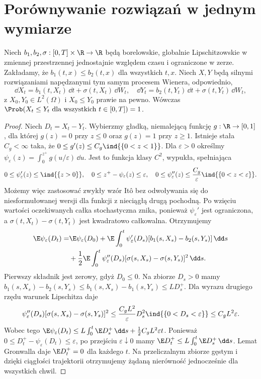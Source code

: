 \section{Porównywanie rozwiązań w jednym wymiarze}
\begin{twierdzenie}
\label{th:sde-comparison}
Niech $b_1,b_2,\sigma:[0,T]\times\R\to\R$
będą borelowskie, globalnie Lipschitzowskie w
zmiennej przestrzennej jednostajnie względem czasu
i ograniczone w zerze. Zakładamy, że
$b_1(t,x)\le b_2(t,x)$ dla wszystkich $t,x$.
Niech $X,Y$ będą silnymi rozwiązaniami napędzanymi
tym samym procesem Wienera, odpowiednio,
\[
\dd X_t=b_1(t,X_t)\,\dd t+\sigma(t,X_t)\,\dd W_t,
\quad
\dd Y_t=b_2(t,Y_t)\,\dd t+\sigma(t,Y_t)\,\dd W_t,
\]
z $X_0,Y_0\in L^2(\Omega)$ i $X_0\le Y_0$ prawie
na pewno. Wówczas
$\Prob(X_t\le Y_t\ \text{dla wszystkich }t\in[0,T])=1$.
\end{twierdzenie}
\begin{proof}
Niech $D_t=X_t-Y_t$. Wybierzmy gładką, niemalejącą
funkcję $g:\R\to[0,1]$, dla której $g(z)=0$
przy $z\le0$ oraz $g(z)=1$ przy $z\ge1$.
Istnieje stała $C_g<\infty$ taka, że
$0\le g'(z)\le C_g\ind{\{0<z<1\}}$.
Dla $\varepsilon>0$ określmy
$\psi_\varepsilon(z)=\int_0^{z^+}g(u/\varepsilon)\,\dd u$.
Jest to funkcja klasy $C^2$, wypukła, spełniająca
\[
0\le\psi_\varepsilon'(z)\le\ind{\{z>0\}},\quad
0\le z^+-\psi_\varepsilon(z)\le\varepsilon,\quad
0\le\psi_\varepsilon''(z)\le
\frac{C_g}{\varepsilon}\ind{\{0<z<\varepsilon\}}.
\]
Możemy więc zastosować zwykły wzór Itô bez
odwoływania się do niesformułowanej wersji dla
funkcji z nieciągłą drugą pochodną. Po wzięciu
wartości oczekiwanych
całka stochastyczna znika, ponieważ
$\psi_\varepsilon'$ jest ograniczona, a
$\sigma(t,X_t)-\sigma(t,Y_t)$ jest kwadratowo
całkowalna. Otrzymujemy
\[
\begin{split}
\E\psi_\varepsilon(D_t)
=&\E\psi_\varepsilon(D_0)
+\E\int_0^t\psi_\varepsilon'(D_s)
[b_1(s,X_s)-b_2(s,Y_s)]\,\dd s\\
&+\frac12\E\int_0^t\psi_\varepsilon''(D_s)
[\sigma(s,X_s)-\sigma(s,Y_s)]^2\,\dd s.
\end{split}
\]
Pierwszy składnik jest zerowy, gdyż $D_0\le0$.
Na zbiorze $D_s>0$ mamy
$b_1(s,X_s)-b_2(s,Y_s)
\le b_1(s,X_s)-b_1(s,Y_s)\le L D_s^+$.
Dla wyrazu drugiego rzędu warunek Lipschitza daje
\[
\psi_\varepsilon''(D_s)
[\sigma(s,X_s)-\sigma(s,Y_s)]^2
\le \frac{C_gL^2}{\varepsilon}D_s^2
\ind{\{0<D_s<\varepsilon\}}\le C_gL^2\varepsilon.
\]
Wobec tego
$\E\psi_\varepsilon(D_t)
\le L\int_0^t\E D_s^+\,\dd s+
\tfrac12 C_gL^2\varepsilon t$.
Ponieważ $0\le D_t^+-\psi_\varepsilon(D_t)\le\varepsilon$,
po przejściu $\varepsilon\downarrow0$ mamy
$\E D_t^+\le L\int_0^t\E D_s^+\,\dd s$.
Lemat Gronwalla daje $\E D_t^+=0$ dla każdego $t$.
Na przeliczalnym zbiorze gęstym i dzięki ciągłości
trajektorii otrzymujemy żądaną nierówność
jednocześnie dla wszystkich chwil.
\end{proof}

